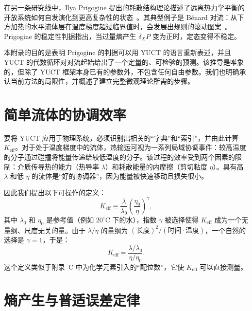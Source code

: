 \documentclass[12pt,a4paper]{article}
\begin{document}
	在另一条研究线中，Ilya Prigogine 提出的耗散结构理论描述了远离热力学平衡的开放系统如何自发演化到更高复杂性的状态~\cite{Prigogine1977, Glansdorff1971}。其典型例子是 B\'{e}nard 对流：从下方加热的水平流体层在温度梯度超过临界值时，会发展出规则的滚动图案~\cite{Chandrasekhar1961}。Prigogine 的稳定性判据指出，当过量熵产生 \(\delta_X P\) 变为正时，定态变得不稳定。
	
	本附录的目的是表明 Prigogine 的判据可以用 YUCT 的语言重新表述，并且 YUCT 的代数循环对对流起始给出了一个定量的、可检验的预测。该推导是唯象的，但除了 YUCT 框架本身已有的参数外，不包含任何自由参数。我们也明确承认当前方法的局限性，并概述了建立完整微观理论所需的步骤。
	
	\section{简单流体的协调效率}
	
	要将 YUCT 应用于物理系统，必须识别出相关的“字典”和“索引”，并由此计算 \(K_{\mathrm{eff}}\)。对于处于温度梯度中的流体，热输运可视为一系列局域协调事件：较高温度的分子通过碰撞将能量传递给较低温度的分子。该过程的效率受到两个因素的限制：介质传导热的能力（热导率 \(\lambda\)）和耗散能量的内摩擦（剪切粘度 \(\eta\)）。具有高 \(\lambda\) 和低 \(\eta\) 的流体是“好的协调器”，因为能量被快速移动且损失很小。
	
	因此我们提出以下可操作的定义：
	\begin{equation}\label{eq:Keff-fluid}
		K_{\mathrm{eff}} \equiv \frac{\lambda}{\lambda_0} \left( \frac{\eta_0}{\eta} \right)^{\gamma},
	\end{equation}
	其中 \(\lambda_0\) 和 \(\eta_0\) 是参考值（例如 \(20^\circ\)C 下的水），指数 \(\gamma\) 被选择使得 \(K_{\mathrm{eff}}\) 成为一个无量纲、尺度无关的量。由于 \(\lambda/\eta\) 的量纲为 \((\mathrm{长度})^2/(\mathrm{时间}\cdot\mathrm{温度})\)，一个自然的选择是 \(\gamma = 1\)，于是：
	\begin{equation}\label{eq:Keff-fluid2}
		K_{\mathrm{eff}} = \frac{\lambda / \lambda_0}{\eta / \eta_0}.
	\end{equation}
	这个定义类似于附录~C 中为化学元素引入的“配位数”，它使 \(K_{\mathrm{eff}}\) 可以直接测量。
	
	\section{熵产生与普适误差定律}
	
\end{document}
